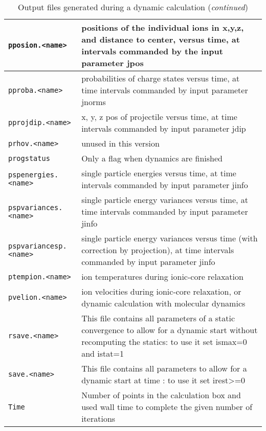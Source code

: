 \documentclass[11pt,a4paper]{article}
\begin{document}
			\begin{table}[!htbp]
				\caption{Output files generated during a dynamic calculation (\emph{continued})}\label{tab:dynamic-output-files-cont}
				\begin{tabular}{|p{4.5cm}|p{10.2cm}|}
					\hline
					\texttt{pposion.<name>} & positions of the individual ions in x,y,z, and distance to center, versus time, at intervals commanded by the input parameter jpos\\
					\hline
					\texttt{pproba.<name>} & probabilities of charge states versus time, at time intervals commanded by input parameter jnorms\\
					\hline
					\texttt{pprojdip.<name>} & x, y, z pos of projectile versus time, at time intervals commanded by input parameter jdip\\
					\hline
					\texttt{prhov.<name>} & unused in this version\\
					\hline
					\texttt{progstatus} & Only a flag when dynamics are finished\\
					\hline
					\texttt{pspenergies.<name>} & single particle energies versus time, at time intervals commanded by input parameter jinfo\\
					\hline
					\texttt{pspvariances.<name>} & single particle energy variances versus time, at time intervals commanded by input parameter jinfo\\
					\hline
					\texttt{pspvariancesp.<name>} & single particle energy variances versus time (with correction by projection), at time intervals commanded by input parameter jinfo \\
					\hline
					\texttt{ptempion.<name>} & ion temperatures during ionic-core relaxation\\
					\hline
					\texttt{pvelion.<name>} & ion velocities during ionic-core relaxation, or dynamic calculation with molecular dynamics\\
					\hline
					\texttt{rsave.<name>} & This file contains all parameters of a static convergence to allow for a dynamic start without recomputing the statics: to use it set ismax=0 and istat=1  \\
					\hline
					\texttt{save.<name>} & This file contains all parameters to allow for a dynamic start at time : to use it set  irest>=0 \\
					\hline
					\texttt{Time} & Number of points in the calculation box and used wall time to complete the given number of iterations\\
					\hline
				\end{tabular}
			\end{table}
\end{document}
